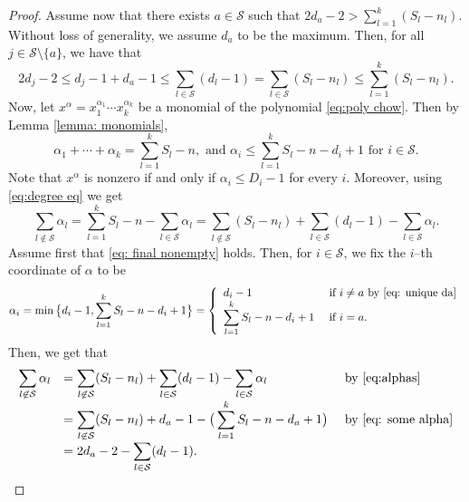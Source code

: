 \documentclass[10pt,a4paper]{amsart}
\begin{document}
\begin{proof}
  Assume now that there exists $a\in\mathcal S$ such that $2d_a-2>\sum_{l=1}^k(S_l-n_l)$. Without loss of generality, we assume $d_a$ to be the maximum.  Then, for all $j\in\mathcal S\setminus \{a\}$, we have that 
    \begin{equation}\label{eq: unique da}
   2d_j-2\le d_j-1+d_a-1\le\sum_{l\in\mathcal S}(d_l-1)=\sum_{l\in\mathcal S}(S_l-n_l)\le\sum_{l=1}^k(S_l-n_l).
    \end{equation}
    Now, let $x^{\alpha}=x_1^{\alpha_1}\cdots x_k^{\alpha_k}$ be a monomial of the polynomial \eqref{eq:poly chow}. Then by Lemma \ref{lemma: monomials},
    \begin{equation}
        \label{eq:degree eq}
         \alpha_1+\cdots+\alpha_k=\sum_{l=1}^k S_l-n, \text{ and }\alpha_i\leq \sum_{l=1}^k S_l-n-d_i+1 \text{ for } i\in\mathcal S.
    \end{equation}
    Note that $x^\alpha$ is nonzero if and only if $\alpha_i\leq D_i-1$ for every $i$.
    Moreover, using \eqref{eq:degree eq} we get \begin{equation}\label{eq:alphas}
    \sum_{l\not\in\mathcal S}\alpha_l=\sum_{l=1}^k S_l-n-\sum_{l\in\mathcal S}\alpha_l=\sum_{l\not\in\mathcal S} (S_l-n_l)+\sum_{l\in\mathcal S}(d_l-1)-\sum_{l\in\mathcal S}\alpha_l.
    \end{equation}
    Assume first that \eqref{eq: final nonempty} holds. Then, for $i\in\mathcal S$, we fix the $i$--th coordinate of $\alpha$ to be
    \begin{equation}
        \label{eq: some alpha}
        \alpha_i=\min\big\{d_i-1,\sum_{l=1}^k S_l-n-d_i+1\big\}=\left\{\begin{array}{ll}
             d_i-1&\text{ if }i\ne a\text{ by \eqref{eq: unique da}}\\
             \displaystyle\sum_{l=1}^k S_l-n-d_i+1&\text{ if }i=a.
        \end{array}\right.
    \end{equation}
        Then, we get that  
        \begin{equation}\label{eq: sum of alphas}
\begin{array}{lll}
  \displaystyle  \sum_{l\not\in\mathcal S}\alpha_l&  \displaystyle =\sum_{l\not\in\mathcal S} (S_l-n_l)+\sum_{l\in\mathcal S}(d_l-1)-\sum_{l\in\mathcal S}\alpha_l&\text{ by \eqref{eq:alphas}}\\
  &  \displaystyle =\sum_{l\not\in\mathcal S} (S_l-n_l)+d_a-1-\big(\sum_{l=1}^k S_l-n-d_a+1\big)&\text{ by \eqref{eq: some alpha}}\\
  &  \displaystyle =2d_a-2-\sum_{l\in\mathcal S}(d_l-1).
\end{array}
        \end{equation}
        

\end{proof}
\end{document}
